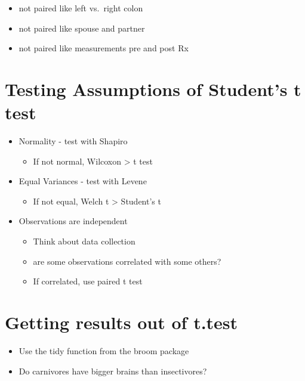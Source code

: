 \documentclass[
]{book}
\providecommand{\tightlist}{%
  \setlength{\itemsep}{0pt}\setlength{\parskip}{0pt}}
\begin{document}
\begin{itemize}
\tightlist
\item
  not paired like left vs.~right colon
\item
  not paired like spouse and partner
\item
  not paired like measurements pre and post Rx
\end{itemize}

\hypertarget{testing-assumptions-of-students-t-test-1}{%
\section{Testing Assumptions of Student's t test}\label{testing-assumptions-of-students-t-test-1}}

\begin{itemize}
\tightlist
\item
  Normality - test with Shapiro

  \begin{itemize}
  \tightlist
  \item
    If not normal, Wilcoxon \textgreater{} t test
  \end{itemize}
\item
  Equal Variances - test with Levene

  \begin{itemize}
  \tightlist
  \item
    If not equal, Welch t \textgreater{} Student's t
  \end{itemize}
\item
  Observations are independent

  \begin{itemize}
  \tightlist
  \item
    Think about data collection
  \item
    are some observations correlated with some others?
  \item
    If correlated, use paired t test
  \end{itemize}
\end{itemize}

\hypertarget{getting-results-out-of-t.test-2}{%
\section{Getting results out of t.test}\label{getting-results-out-of-t.test-2}}

\begin{itemize}
\tightlist
\item
  Use the tidy function from the broom package
\item
  Do carnivores have bigger brains than insectivores?
\end{itemize}
\end{document}
